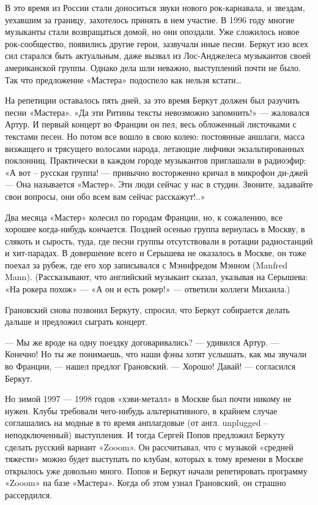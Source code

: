 \documentclass[10pt, twoside]{book}
\begin{document}
В это время из России стали доноситься звуки нового рок-карнавала, и звездам, уехавшим за границу, захотелось принять в
нем участие. В 1996 году многие музыканты стали возвращаться домой, но они опоздали. Уже сложилось новое рок-сообщество,
появились другие герои, зазвучали иные песни. Беркут изо всех сил старался быть актуальным, даже вызвал из Лос-Анджелеса
музыкантов своей американской группы. Однако дела шли неважно, выступлений почти не было. Так что предложение «Мастера»
подоспело как нельзя кстати\ldots

На репетиции оставалось пять дней, за это время Беркут должен был разучить песни «Мастера». «Да эти Ритины тексты
невозможно запомнить!» — жаловался Артур. И первый концерт во Франции он пел, весь обложенный листочками с текстами
песен. Но потом все вошло в свою колею: постоянные аншлаги, масса визжащего и трясущего волосами народа, летающие
лифчики экзальтированных поклонниц. Практически в каждом городе музыкантов приглашали в радиоэфир: «А вот – русская
группа! — привычно восторженно кричал в микрофон ди-джей — Она называется «Мастер». Эти люди сейчас у нас в студии.
Звоните, задавайте свои вопросы, они обо всем вам сейчас расскажут!..»

Два месяца «Мастер» колесил по городам Франции, но, к сожалению, все хорошее когда-нибудь кончается. Поздней осенью
группа вернулась в Москву, в слякоть и сырость, туда, где песни группы отсутствовали в ротации радиостанций и
хит-парадах. В довершение всего и Серышева не оказалось в Москве, он тоже поехал за рубеж, где его хор записывался с
Мэннфредом Мэнном (Manfred Mann). (Рассказывают, что английский музыкант сказал, указывая на Серышева: «На рокера похож»
— «А он и есть рокер!» — ответили коллеги Михаила.)

Грановский снова позвонил Беркуту, спросил, что Беркут собирается делать дальше и предложил сыграть концерт.

— Мы же вроде на одну поездку договаривались? — удивился Артур.
— Конечно! Но ты же понимаешь, что наши фэны хотят услышать, как мы звучали во Франции, — нашел предлог Грановский.
— Хорошо! Давай! — согласился Беркут.

Но зимой 1997 — 1998 годов «хэви-металл» в Москве был почти никому не нужен. Клубы требовали чего-нибудь
альтернативного, в крайнем случае соглашались на модные в то время анплагдовые (от англ. unplugged – неподключенный)
выступления. И тогда Сергей Попов предложил Беркуту сделать русский вариант «Zooom». Он рассчитывал, что с музыкой
«средней тяжести» можно будет выступать по клубам, которых к тому времени в Москве открылось уже довольно много. Попов и
Беркут начали репетировать программу «Zooom» на базе «Мастера». Когда об этом узнал Грановский, он страшно рассердился.
\end{document}
